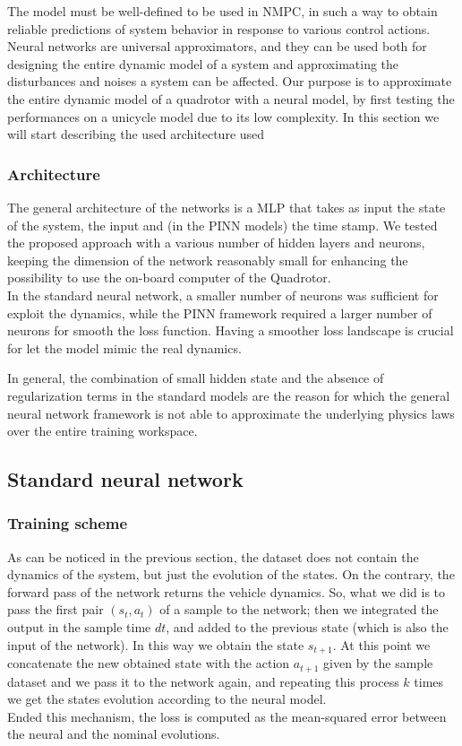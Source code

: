 The model must be well-defined to be used in NMPC, in such a way 
to obtain reliable predictions of system behavior in response to various control actions.
Neural networks are universal approximators, and they can be used both for designing 
the entire dynamic model of a system and approximating the disturbances and noises 
a system can be affected.
Our purpose is to approximate the entire dynamic model of a quadrotor with a neural model, by first testing the performances on a unicycle model due to its low complexity. 
In this section we will start describing the used architecture used 

\subsubsection{Architecture}
The general architecture of the networks is a MLP that takes as input the state of the system, the input and (in the PINN models) the time stamp.
We tested the proposed approach with a various number of hidden layers and neurons, keeping the dimension of the network reasonably small for enhancing the possibility to use the on-board computer of the Quadrotor.
\\

In the standard neural network, a smaller number of neurons was sufficient for exploit the dynamics, while the PINN framework required a larger number of neurons for smooth 
the loss function. Having a smoother loss landscape is crucial for let the model mimic the real dynamics.

In general, the combination of small hidden state and the absence of regularization terms in the standard models are 
the reason for which the general neural network framework is not able to approximate the underlying physics laws over the entire training workspace.


\subsection{Standard neural network}

\subsubsection{Training scheme}

As can be noticed in the previous section, the dataset does not contain the
dynamics of the system, but just the evolution of the states. On the
contrary, the forward pass of the network returns the vehicle dynamics. So,
what we did is to pass the first pair $(s_t, a_t)$ of a sample to the
network; then we integrated the output in the sample time $dt$, and added
to the previous state (which is also the input of the network). In this way
we obtain the state $s_{t+1}$. At this point we concatenate the new
obtained state with the action $a_{t+1}$ given by the sample dataset and we
pass it to the network again, and repeating this process $k$ times we get
the states evolution according to the neural model. \\
Ended this mechanism, the loss is computed as the mean-squared error between the neural and the nominal evolutions. 

